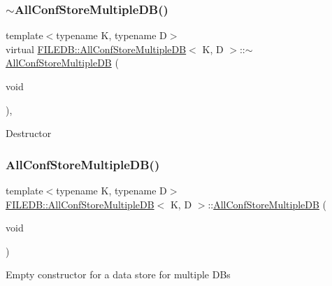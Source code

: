 \subsubsection{\texorpdfstring{$\sim$AllConfStoreMultipleDB()}{~AllConfStoreMultipleDB()}\hspace{0.1cm}{\footnotesize\ttfamily [2/3]}}
{\footnotesize\ttfamily template$<$typename K, typename D$>$ \\
virtual \mbox{\hyperlink{classFILEDB_1_1AllConfStoreMultipleDB}{F\+I\+L\+E\+D\+B\+::\+All\+Conf\+Store\+Multiple\+DB}}$<$ K, D $>$\+::$\sim$\mbox{\hyperlink{classFILEDB_1_1AllConfStoreMultipleDB}{All\+Conf\+Store\+Multiple\+DB}} (\begin{DoxyParamCaption}\item[{void}]{ }\end{DoxyParamCaption})\hspace{0.3cm}{\ttfamily [inline]}, {\ttfamily [virtual]}}

Destructor \mbox{\label{classFILEDB_1_1AllConfStoreMultipleDB_a0c45fce64168ca576e875747eb599927}} 
\subsubsection{\texorpdfstring{AllConfStoreMultipleDB()}{AllConfStoreMultipleDB()}\hspace{0.1cm}{\footnotesize\ttfamily [3/3]}}
{\footnotesize\ttfamily template$<$typename K, typename D$>$ \\
\mbox{\hyperlink{classFILEDB_1_1AllConfStoreMultipleDB}{F\+I\+L\+E\+D\+B\+::\+All\+Conf\+Store\+Multiple\+DB}}$<$ K, D $>$\+::\mbox{\hyperlink{classFILEDB_1_1AllConfStoreMultipleDB}{All\+Conf\+Store\+Multiple\+DB}} (\begin{DoxyParamCaption}\item[{void}]{ }\end{DoxyParamCaption})\hspace{0.3cm}{\ttfamily [inline]}}

Empty constructor for a data store for multiple D\+Bs \mbox{\label{classFILEDB_1_1AllConfStoreMultipleDB_a88489be8d488c6fe3a88312f200e7fdd}} 
